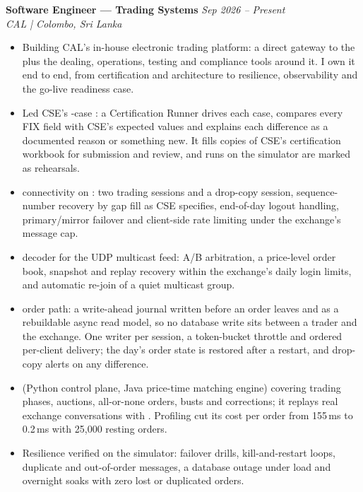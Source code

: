 \par
\noindent
\textbf{Software Engineer --- Trading Systems} \hfill \textit{Sep 2026 -- Present}\\
\noindent
\textit{CAL | Colombo, Sri Lanka}\\[0.05em]

\begin{itemize}[leftmargin=*, itemsep=0.3em, topsep=0.01em]
  \item Building CAL's in-house electronic trading platform: a direct gateway to the  plus the dealing, operations, testing and compliance tools around it. I own it end to end, from certification and architecture to resilience, observability and the go-live readiness case.
  \item Led CSE's -case : a Certification Runner drives each case, compares every FIX field with CSE's expected values and explains each difference as a documented reason or something new. It fills copies of CSE's certification workbook for submission and review, and runs on the simulator are marked as rehearsals.
  \item {} connectivity on : two trading sessions and a drop-copy session, sequence-number recovery by gap fill as CSE specifies, end-of-day logout handling, primary/mirror failover and client-side rate limiting under the exchange's message cap.
  \item {} decoder for the  UDP multicast feed: A/B arbitration, a price-level order book, snapshot and replay recovery within the exchange's daily login limits, and automatic re-join of a quiet multicast group.
  \item {} order path: a  write-ahead journal written before an order leaves and  as a rebuildable async read model, so no database write sits between a trader and the exchange. One writer per session, a token-bucket throttle and ordered per-client delivery; the day's order state is restored after a restart, and drop-copy  alerts on any difference.
  \item {} (Python control plane, Java price-time matching engine) covering trading phases, auctions, all-or-none orders, busts and corrections; it replays  real exchange conversations with . Profiling cut its cost per order from 155\,ms to 0.2\,ms with 25,000 resting orders.
  \item Resilience verified on the simulator: failover drills, kill-and-restart loops, duplicate and out-of-order messages, a database outage under load and overnight soaks with zero lost or duplicated orders.

\end{itemize}
